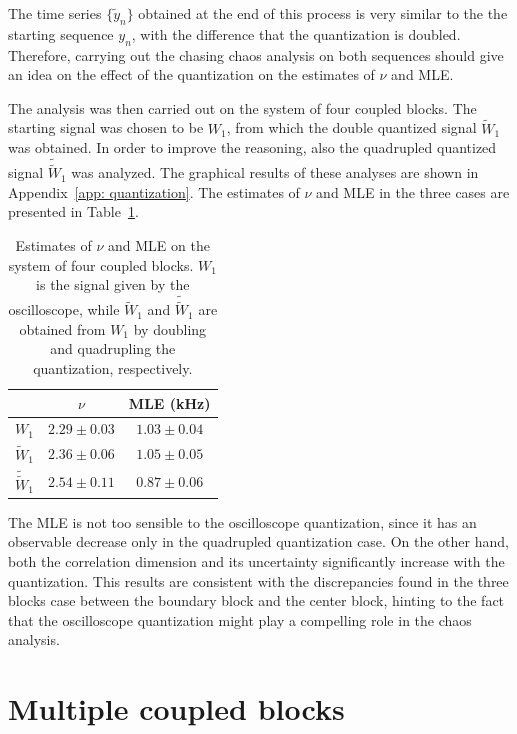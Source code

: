 The time series $\{\tilde{y}_n\}$ obtained at the end of this process is very similar to the
the starting sequence $y_n$, with the difference that the quantization is doubled.
Therefore, carrying out the chasing chaos analysis on both sequences should give an idea on the
effect of the quantization on the estimates of $\nu$ and MLE\@.

The analysis was then carried out on the system of four coupled blocks.
The starting signal was chosen to be $W_1$, from which the double quantized signal $\tilde{W}_1$
was obtained. In order to improve the reasoning, also the quadrupled quantized signal $\tilde{\tilde{W}}_1$
was analyzed. The graphical results of these analyses are shown in Appendix~\ref{app: quantization}.
The estimates of $\nu$ and MLE in the three cases are presented in Table~\ref{tab: quantization}.

\begin{table}[!htbp]
    \centering
    \begin{tabular}{c|c|c}
                    & $\nu$         & MLE (kHz)     \\ \hline
        $W_1$       & $2.29\pm0.03$   & $1.03\pm0.04$ \\ \hline
        $\tilde{W}_1$ & $2.36\pm0.06$   & $1.05\pm0.05$ \\ \hline
        $\tilde{\tilde{W}}_1$ & $2.54\pm0.11$ & $0.87\pm0.06$
    \end{tabular}
    \caption{Estimates of $\nu$ and MLE on the system of four coupled blocks.
    $W_1$ is the signal given by the oscilloscope, while $\tilde{W}_1$ and $\tilde{\tilde{W}}_1$ are
    obtained from $W_1$ by doubling and quadrupling the quantization, respectively.
    }\label{tab: quantization}
\end{table}

The MLE is not too sensible to the oscilloscope quantization, since it has an observable decrease
only in the quadrupled quantization case. On the other hand, both the correlation dimension and
its uncertainty significantly increase with the quantization.
This results are consistent with the discrepancies found in the three blocks case between
the boundary block and the center block, hinting to the fact that the oscilloscope quantization
might play a compelling role in the chaos analysis.


\section{Multiple coupled blocks}\label{sec: many blocks chaos}

